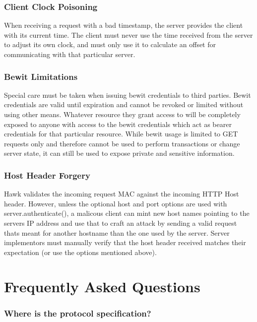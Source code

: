 \subsubsection*{Client Clock Poisoning}

When receiving a request with a bad timestamp, the server provides the client with its current time. The client must never use the time received from the server to adjust its own clock, and must only use it to calculate an offset for communicating with that particular server.

\subsubsection*{Bewit Limitations}

Special care must be taken when issuing bewit credentials to third parties. Bewit credentials are valid until expiration and cannot be revoked or limited without using other means. Whatever resource they grant access to will be completely exposed to anyone with access to the bewit credentials which act as bearer credentials for that particular resource. While bewit usage is limited to G\+E\+T requests only and therefore cannot be used to perform transactions or change server state, it can still be used to expose private and sensitive information.

\subsubsection*{Host Header Forgery}

Hawk validates the incoming request M\+A\+C against the incoming H\+T\+T\+P Host header. However, unless the optional {\ttfamily host} and {\ttfamily port} options are used with {\ttfamily server.\+authenticate()}, a malicous client can mint new host names pointing to the server\textquotesingle{}s I\+P address and use that to craft an attack by sending a valid request that\textquotesingle{}s meant for another hostname than the one used by the server. Server implementors must manually verify that the host header received matches their expectation (or use the options mentioned above).

\section*{Frequently Asked Questions}

\subsubsection*{Where is the protocol specification?}

